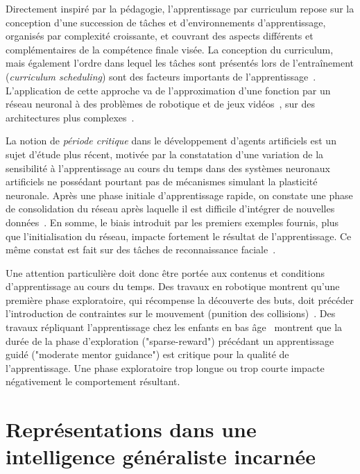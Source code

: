 Directement inspiré par la pédagogie, l'apprentissage par curriculum repose sur la conception d'une succession de tâches et d'environnements d'apprentissage, organisés par complexité croissante, et couvrant des aspects différents et complémentaires de la compétence finale visée. La conception du curriculum, mais également l'ordre dans lequel les tâches sont présentés lors de l'entraînement (\emph{curriculum scheduling}) sont des facteurs importants de l'apprentissage~\cite{wang2021survey}. L'application de cette approche va de l’approximation d’une fonction par un réseau neuronal à des problèmes de robotique et de jeux vidéos~\cite{narvekar2016source}, sur des architectures plus complexes~\cite{suro2021mind}.

La notion de \emph{période critique} dans le développement d'agents artificiels est un sujet d'étude plus récent, motivée par la constatation d'une variation de la sensibilité à l'apprentissage au cours du temps dans des systèmes neuronaux artificiels ne possédant pourtant pas de mécanismes simulant la plasticité neuronale. Après une phase initiale d'apprentissage rapide, on constate une phase de consolidation du réseau après laquelle il est difficile d'intégrer de nouvelles données~\cite{achille2017critical}.
En somme, le biais introduit par les premiers exemples fournis, plus que l'initialisation du réseau, impacte fortement le résultat de l'apprentissage.
Ce même constat est fait sur des tâches de reconnaissance faciale~\cite{wang2024critical}.

Une attention particulière doit donc être portée aux contenus et conditions d'apprentissage au cours du temps. Des travaux en robotique montrent qu'une première phase exploratoire, qui récompense la découverte des buts, doit précéder l'introduction de contraintes sur le mouvement (punition des collisions)~\cite{de2022critical}.
Des travaux répliquant l'apprentissage chez les enfants en bas âge~\cite{park2021toddler} montrent que la durée de la phase d'exploration ("sparse-reward") précédant un apprentissage guidé ("moderate mentor guidance") est critique pour la qualité de l'apprentissage. Une phase exploratoire trop longue ou trop courte impacte négativement le comportement résultant.

\section{Représentations dans une intelligence généraliste incarnée}


